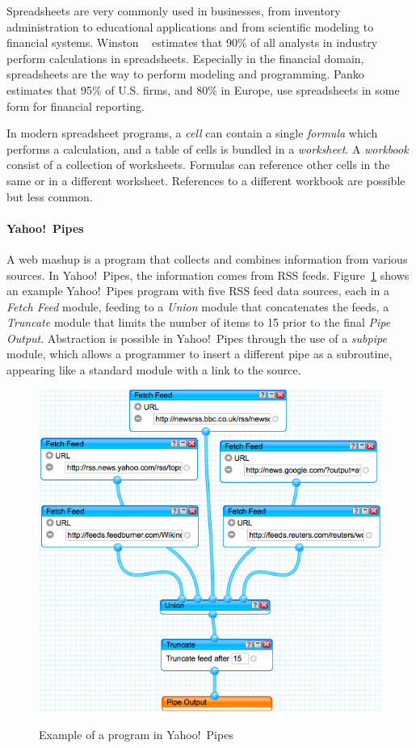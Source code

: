 \documentclass[10pt,conference,compsocconf]{IEEEtran}
\begin{document}
Spreadsheets are very commonly used in businesses, from inventory administration to educational applications and from scientific modeling to financial systems. Winston ~\cite{Wins2001} estimates that 90\% of all analysts in industry perform calculations in spreadsheets. Especially in the financial domain, spreadsheets are the way to perform modeling and programming. Panko~\cite{Pank2006} estimates that 95\% of U.S. firms, and 80\% in Europe, use spreadsheets in some form for financial reporting. 

In modern spreadsheet programs, a \textit{cell} can contain a single \textit{formula} which performs a calculation, and a table of cells is bundled in a \textit{worksheet}.
A \textit{workbook} consist of a collection of worksheets.
Formulas can reference other cells in the same or in a different worksheet.
References to a different workbook are possible but less common.


\paragraph{Yahoo!\ Pipes}
A web mashup is a program that collects and combines information from various
sources. 
In  Yahoo!\ Pipes, the information comes from RSS feeds. Figure~\ref{fig:ypexample} shows an example Yahoo!\ Pipes program with five RSS feed data sources, each in a \emph{Fetch Feed} module, feeding to a \emph{Union} module that concatenates the feeds, a \emph{Truncate} module that limits the number of items to 15 prior to the final \emph{Pipe Output}. 
Abstraction is possible in Yahoo!\ Pipes through the use of a \emph{subpipe} module, which allows a programmer to insert a different pipe as a subroutine, appearing like a standard module with a link to the source. 

\begin{figure}
\caption{Example of a program in Yahoo!\ Pipes}
\centering
\includegraphics[width=\columnwidth]{yp-1}
\label{fig:ypexample}
\end{figure}
\end{document}
